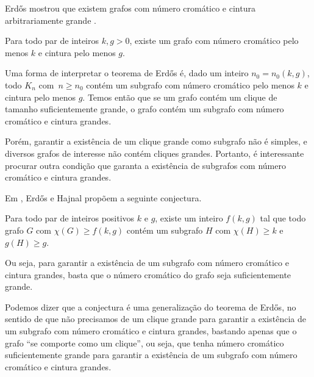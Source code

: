 
Erd\H{o}s mostrou que existem grafos com número cromático e cintura arbitrariamente grande \cite{erdos1959graph}.

\begin{teorema}\label{teoerdos}
Para todo par de inteiros $k,g > 0$, existe um grafo com número cromático pelo menos $k$ e cintura pelo menos $g$.
\end{teorema}

Uma forma de interpretar o teorema de Erd\H{o}s é, dado um inteiro $n_0 = n_0(k,g)$, todo $K_n$ com~$n \geq n_0$ contém um subgrafo com número cromático pelo menos $k$ e cintura pelo menos $g$. Temos então que se um grafo contém um clique de tamanho suficientemente grande, o grafo contém um subgrafo com número cromático e cintura grandes.

Porém, garantir a existência de um clique grande como subgrafo não é simples, e diversos grafos de interesse não contém cliques grandes. Portanto, é interessante procurar outra condição que garanta a existência de subgrafos com número cromático e cintura grandes.

Em \cite{erdos1969conj}, Erd\H{o}s e Hajnal propõem a seguinte conjectura.

\begin{conjectura}
Para todo par de inteiros positivos $k$ e $g$, existe um inteiro $f(k,g)$ tal que todo grafo $G$ com $\chi(G) \geq f(k,g)$ contém um subgrafo $H$ com $\chi(H) \geq k$ e $g(H) \geq g$.
\end{conjectura}

Ou seja, para garantir a existência de um subgrafo com número cromático e cintura grandes, basta que o número cromático do grafo seja suficientemente grande.

Podemos dizer que a conjectura é uma generalização do teorema de Erd\H{o}s, no sentido de que não precisamos de um clique grande para garantir a existência de um subgrafo com número cromático e cintura grandes, bastando apenas que o grafo ``se comporte como um clique'', ou seja, que tenha número cromático suficientemente grande para garantir a existência de um subgrafo com número cromático e cintura grandes.

